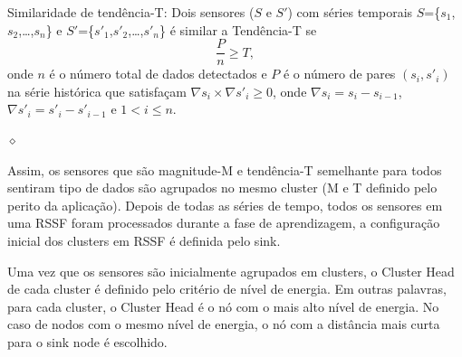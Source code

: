 \documentclass{acm_proc_article-sp}
\newcommand{\dia}{\hspace*{.1cm} \hfill $\diamond$}
\begin{document}
\begin{defini}

Similaridade de tendência-T: Dois sensores ($S$ e $S'$) com séries temporais
$S$=\{$s_{1}$,$s_{2}$,\ldots,$s_{n}$\} e
$S'$=\{$s'_{1}$,$s'_{2}$,\ldots,$s'_{n}$\} é similar a Tendência-T se
\begin{equation}
\label{equ:trend}
\frac{P}{n} \geq T,
\end{equation}
onde $n$ é o número total de dados detectados e $P$ é o número de pares
$(s_{i},s'_{i})$ na série histórica que satisfaçam $\nabla s_{i} \times \nabla
s'_{i} \geq 0$, onde $\nabla s_{i} = s_{i} - s_{i-1}$, $\nabla
s'_{i} = s'_{i} - s'_{i-1}$ e $1 < i \leq n$.

\dia
\end{defini}
\vspace*{-.5cm}

Assim, os sensores que são magnitude-M e tendência-T semelhante para
todos sentiram tipo de dados são agrupados no mesmo cluster (M e T definido
pelo perito da aplicação). Depois de todas as séries de tempo, todos os 
sensores em uma RSSF foram processados durante a fase de aprendizagem,
a configuração inicial dos clusters em RSSF é definida pelo sink.
\vspace*{-.3cm}

Uma vez que os sensores são inicialmente agrupados em clusters,
o Cluster Head de cada cluster é definido pelo critério de nível de energia.
Em outras palavras, para cada cluster, o Cluster Head é o nó com o mais alto
nível de energia. No caso de nodos com o mesmo nível de energia, o nó com a
distância mais curta para o sink node é escolhido.
\vspace*{-.3cm}
\end{document}
